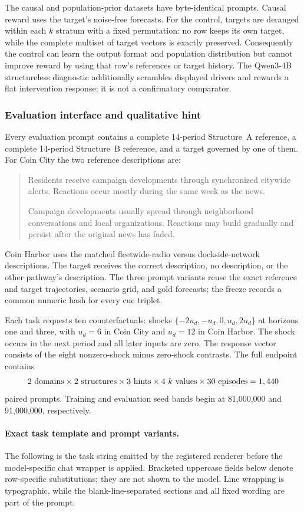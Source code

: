 The causal and population-prior datasets have byte-identical prompts. Causal
reward uses the target's noise-free forecasts. For the control, targets are
deranged within each $k$ stratum with a fixed permutation: no row keeps its own
target, while the complete multiset of target vectors is exactly preserved.
Consequently the control can learn the output format and population distribution
but cannot improve reward by using that row's references or target history.
The Qwen3-4B structureless diagnostic additionally scrambles displayed drivers
and rewards a flat intervention response; it is not a confirmatory comparator.

\subsubsection{Evaluation interface and qualitative hint}

Every evaluation prompt contains a complete 14-period Structure~A reference, a
complete 14-period Structure~B reference, and a target governed by one of them.
For Coin City the two reference descriptions are:
\begin{quote}\small
Residents receive campaign developments through synchronized citywide alerts.
Reactions occur mostly during the same week as the news.

Campaign developments usually spread through neighborhood conversations and
local organizations. Reactions may build gradually and persist after the
original news has faded.
\end{quote}
Coin Harbor uses the matched fleetwide-radio versus dockside-network descriptions.
The target receives the correct description, no description, or the other
pathway's description. The three prompt variants reuse the exact reference and
target trajectories, scenario grid, and gold forecasts; the freeze records a
common numeric hash for every cue triplet.

Each task requests ten counterfactuals: shocks
$\{-2u_d,-u_d,0,u_d,2u_d\}$ at horizons one and three, with $u_d=6$ in Coin City
and $u_d=12$ in Coin Harbor. The shock occurs in the next period and all later
inputs are zero. The response vector consists of the eight nonzero-shock minus
zero-shock contrasts. The full endpoint contains
\[
2\ {\rm domains}\times2\ {\rm structures}\times3\ {\rm hints}\times
4\ k{\rm\ values}\times30\ {\rm episodes}=1,440
\]
paired prompts. Training and evaluation seed bands begin at 81,000,000 and
91,000,000, respectively.

\paragraph{Exact task template and prompt variants.}
\label{app:exp3-coin-prompts}
The following is the task string emitted by the registered renderer before the
model-specific chat wrapper is applied. Bracketed uppercase fields below denote
row-specific substitutions; they are not shown to the model. Line wrapping is
typographic, while the blank-line-separated sections and all fixed wording are
part of the prompt.

